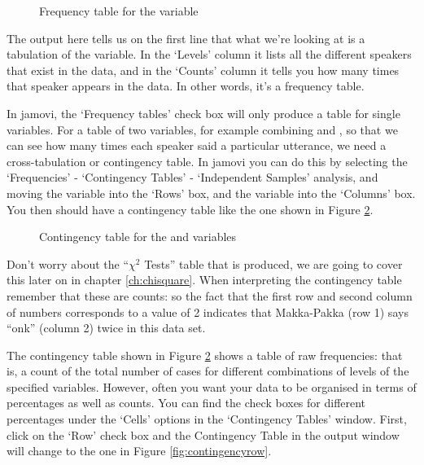 \begin{figure}[h!!]
\begin{center}
\caption{Frequency table for the  variable}
\label{fig:freqtable}
\HR
\end{center}
\end{figure}

The output here tells us on the first line that what we're looking at is a tabulation of the  variable. In the `Levels' column it lists all the different speakers that exist in the data, and in the `Counts' column it tells you how many times that speaker appears in the data. In other words, it's a frequency table. 

In jamovi, the `Frequency tables' check box will only produce a table for single variables. For a table of two variables, for example combining  and , so that we can see how many times each speaker said a particular utterance, we need a cross-tabulation or contingency table. In jamovi you can do this by selecting the `Frequencies' - `Contingency Tables' - `Independent Samples' analysis, and moving the  variable into the `Rows' box, and the  variable into the `Columns' box. You then should have a contingency table like the one shown in Figure \ref{fig:contingencytable}. \\


\begin{figure}[h!!]
\begin{center}
\caption{Contingency table for the  and  variables}
\label{fig:contingencytable}
\HR
\end{center}
\end{figure}

Don't worry about the ``$\chi^2$ Tests'' table that is produced, we are going to cover this later on in chapter \ref{ch:chisquare}. When interpreting the contingency table remember that these are counts: so the fact that the first row and second column of numbers corresponds to a value of 2 indicates that Makka-Pakka (row 1) says ``onk'' (column 2) twice in this data set. 



The contingency table shown in Figure \ref{fig:contingencytable} shows a table of raw frequencies: that is, a count of the total number of cases for different combinations of levels of the specified variables. However, often you want your data to be organised in terms of percentages as well as counts. You can find the check boxes for different percentages under the `Cells' options in the `Contingency Tables' window. First, click on the `Row' check box and the Contingency Table in the output window will change to the one in Figure \ref{fig:contingencyrow}. 


